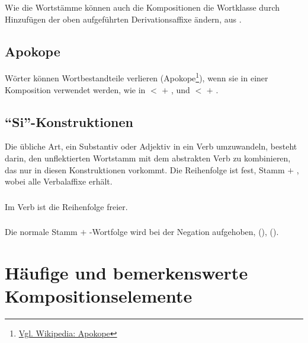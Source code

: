 \subsubsection{} Wie die Wortstämme können auch die Kompositionen die Wortklasse durch Hinzufügen der oben aufgeführten Derivationsaffixe ändern,   aus  .

\subsection{Apokope} Wörter können Wortbestandteile verlieren (Apokope\footnote{\href{https://de.wikipedia.org/wiki/Apokope_(Sprachwissenschaft)}{Vgl. Wikipedia: Apokope}}), wenn sie in einer Komposition verwendet werden, wie in   $<$   $+$  , und   $<$   $+$  .

\subsection{``Si''-Konstruktionen} Die übliche Art, ein Substantiv oder Adjektiv in ein Verb umzuwandeln, besteht darin, den unflektierten Wortstamm mit dem abstrakten Verb  zu kombinieren, das nur in diesen Konstruktionen vorkommt. Die Reihenfolge ist fest, Stamm $+$ , wobei  alle Verbalaffixe erhält.\label{lingop:si-const}

\subsubsection{} Im Verb   ist die Reihenfolge freier.

\subsubsection{} Die normale Stamm $+$ -Wortfolge wird bei der Negation aufgehoben,   (),   ().

\section{Häufige und bemerkenswerte Kompositionselemente}

